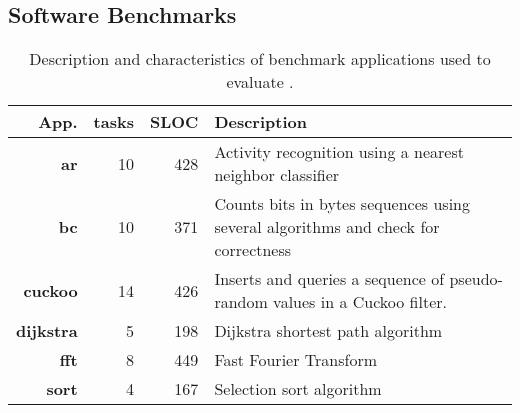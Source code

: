 \subsection{Software Benchmarks}
\label{sec:software_benchmarks}

\begin{table}
	\centering
	\footnotesize
	\begin{tabular}{| r|r|r | p{} |}
		\hline
		App.&tasks&SLOC&Description\\
		\hline\hline
        \textbf{ar} &10 &428 & Activity recognition using a nearest neighbor
classifier\\ %
		\hline
        \textbf{bc} &10 &371 & Counts bits in bytes sequences
using several algorithms and check for correctness\\
		\hline
        \textbf{cuckoo} &14 &426 & Inserts and queries a sequence of pseudo-random
values in a Cuckoo filter.\\
		\hline
        \textbf{dijkstra} &5 &198 & Dijkstra shortest path algorithm \\
		\hline
        \textbf{fft} &8 &449 & Fast Fourier Transform\\ %
		\hline
		\textbf{sort} &4 &167 & Selection sort algorithm\\
		\hline
	\end{tabular}
\caption{Description and characteristics of benchmark applications used to
evaluate \sys.}
\label{table:benchmark_table}
\end{table}

